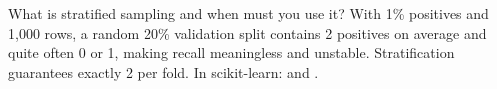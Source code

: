 \begin{qa}{What is stratified sampling and when must you use it?}
\why With 1\% positives and 1{,}000 rows, a random 20\% validation split contains 2 positives on average and
quite often 0 or 1, making recall meaningless and unstable. Stratification guarantees exactly 2 per fold.
In scikit-learn:  and .
\end{qa}
